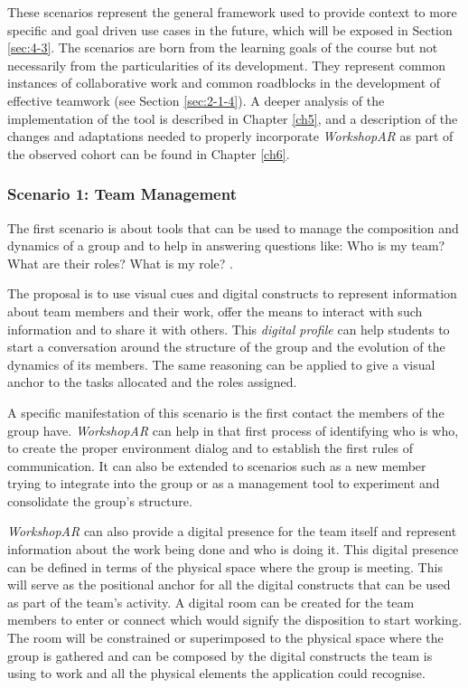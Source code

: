 These scenarios represent the general framework used to provide context to more specific and goal driven use cases in the future, which will be exposed in Section \ref{sec:4-3}.
The scenarios are born from the learning goals of the course but not necessarily from the particularities of its development. They represent common instances of
collaborative work and common roadblocks in the development of effective teamwork (see Section \ref{sec:2-1-4}). A deeper analysis of the implementation of the tool is
described in Chapter \ref{ch5}, and a description of the changes and adaptations needed to properly incorporate \emph{WorkshopAR} as part of the observed cohort can be found in
Chapter \ref{ch6}.

\subsubsection{Scenario 1: Team Management \label{sec:4-1-2-1}}

The first scenario is about tools that can be used to manage the composition and dynamics of a group and to help in answering questions like: Who is my team? What are their
roles? What is my role? \parencite{bannister_2014,delgado_2008}.

The proposal is to use visual cues and digital constructs to represent information about team members and their work, offer the means to interact with such information and
to share it with others. This \emph{digital profile} can help students to start a conversation around the structure of the group and the evolution of the dynamics of its
members. The same reasoning can be applied to give a visual anchor to the tasks allocated and the roles assigned.

A specific manifestation of this scenario is the first contact the members of the group have. \emph{WorkshopAR} can help in that first process of identifying who is who, to
create the proper environment dialog and to establish the first rules of communication. It can also be extended to scenarios such as a new member trying to integrate into
the group or as a management tool to experiment and consolidate the group's structure.

\emph{WorkshopAR} can also provide a digital presence for the team itself and represent information about the work being done and who is doing it. This digital presence
can be defined in terms of the physical space where the group is meeting. This will serve as the positional anchor for all the digital constructs that can be used as part
of the team's activity. A digital room can be created for the team members to enter or connect which would signify the disposition to start working. The room will be
constrained or superimposed to the physical space where the group is gathered and can be composed by the digital constructs the team is using to work and all the physical
elements the application could recognise.

